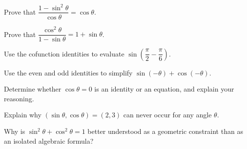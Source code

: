 \begin{exercise}
Prove that $\dfrac{1-\sin^2\theta}{\cos\theta} = \cos\theta$.
\end{exercise}

\begin{exercise}
Prove that $\dfrac{\cos^2\theta}{1-\sin\theta} = 1+\sin\theta$.
\end{exercise}

\begin{exercise}
Use the cofunction identities to evaluate $\sin\left(\dfrac{\pi}{2} -
\dfrac{\pi}{6}\right)$.
\end{exercise}

\begin{exercise}
Use the even and odd identities to simplify $\sin(-\theta) + \cos(-\theta)$.
\end{exercise}

\begin{exercise}
Determine whether $\cos\theta = 0$ is an identity or an equation, and
explain your reasoning.
\end{exercise}

\begin{exercise}
Explain why $(\sin\theta, \cos\theta) = (2,3)$ can never occur for any
angle $\theta$.
\end{exercise}

\begin{exercise}
Why is $\sin^2\theta + \cos^2\theta = 1$ better understood as a geometric
constraint than as an isolated algebraic formula?
\end{exercise}
